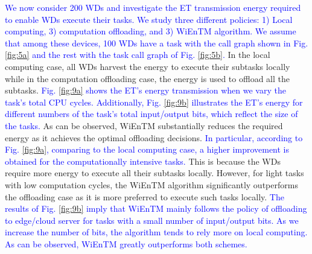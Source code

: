 \documentclass[12pt,draftclsnofoot,onecolumn]{IEEEtran}
\begin{document}
\textcolor{blue}{We now consider 200 WDs and investigate the ET transmission energy required to enable WDs execute their tasks. We study three different policies: 1) Local computing, 3) computation offloading, and 3) WiEnTM algorithm. We assume that among these devices, 100 WDs have a task with the call graph shown in Fig. \ref{fig:5a} and the rest with the task call graph of Fig. \ref{fig:5b}.} In the local computing case, all WDs harvest the energy to execute their subtasks locally while in the computation offloading case, the energy is used to offload all the subtasks. \textcolor{blue}{Fig. \ref{fig:9a} shows the ET's energy transmission when we vary the task's total CPU cycles. Additionally, Fig. \ref{fig:9b} illustrates the ET's energy for different numbers of the task's total input/output bits, which reflect the size of the tasks.} As can be observed, WiEnTM substantially reduces the required energy as it achieves the optimal offloading decisions. \textcolor{blue}{In particular, according to Fig. \ref{fig:9a}, comparing to the local computing case, a higher improvement is obtained for the computationally intensive tasks.} This is because the WDs require more energy to execute all their subtasks locally. However, for light tasks with low computation cycles, the WiEnTM algorithm significantly outperforms the offloading case as it is more preferred to execute such tasks locally. \textcolor{blue}{The results of Fig. \ref{fig:9b} imply that WiEnTM mainly follows the policy of offloading to edge/cloud server for tasks with a small number of input/output bits. As we increase the number of bits, the algorithm tends to rely more on local computing. As can be observed, WiEnTM greatly outperforms both schemes.} 
\end{document}
